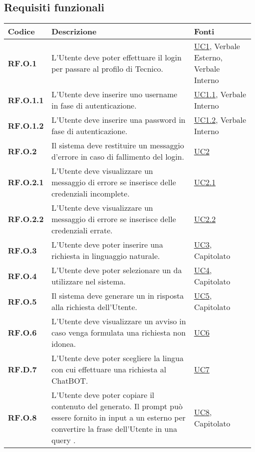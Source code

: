 \subsection{Requisiti funzionali}
\begin{longtable}{|P{3cm}|P{6,5cm}|>{\arraybackslash}P{4cm}|}
    \hline
    \textbf{Codice} & \textbf{Descrizione} & \textbf{Fonti} \\
    \hline
    \textbf{RF.O.1} & L'Utente deve poter effettuare il login per passare al profilo di Tecnico. & \hyperref[UC1]{UC1}, Verbale Esterno, Verbale Interno\\
    \hline
    \textbf{RF.O.1.1} & L'Utente deve inserire uno username in fase di autenticazione. & \hyperref[UC1point1]{UC1.1}, Verbale Interno\\
    \hline
    \textbf{RF.O.1.2} & L'Utente deve inserire una password in fase di autenticazione. & \hyperref[UC1point2]{UC1.2}, Verbale Interno\\
    \hline
    \textbf{RF.O.2} & Il sistema deve restituire un messaggio d'errore in caso di fallimento del login. & \hyperref[UC2]{UC2}\\
    \hline
    \textbf{RF.O.2.1} & L'Utente deve visualizzare un messaggio di errore se inserisce delle credenziali incomplete. & \hyperref[UC2point1]{UC2.1}\\
    \hline
    \textbf{RF.O.2.2} & L'Utente deve visualizzare un messaggio di errore se inserisce delle credenziali errate. & \hyperref[UC2point2]{UC2.2}\\
    \hline
    \textbf{RF.O.3} & L'Utente deve poter inserire una richiesta in linguaggio naturale. & \hyperref[UC3]{UC3}, Capitolato\\
    \hline
    \textbf{RF.O.4} & L'Utente deve poter selezionare un  da utilizzare nel sistema. & \hyperref[UC4]{UC4}, Capitolato\\
    \hline
    \textbf{RF.O.5} & Il sistema deve generare un  in risposta alla richiesta dell'Utente. & \hyperref[UC5]{UC5}, Capitolato\\
    \hline
    \textbf{RF.O.6} & L'Utente deve visualizzare un avviso in caso venga formulata una richiesta non idonea. & \hyperref[UC6]{UC6}\\
    \hline
    \textbf{RF.D.7} & L'Utente deve poter scegliere la lingua con cui effettuare una richiesta al ChatBOT. & \hyperref[UC7]{UC7}\\
    \hline
    \textbf{RF.O.8} & L'Utente deve poter copiare il contenuto del  generato. Il prompt può essere fornito in input a un  esterno per convertire la frase dell'Utente in una query . & \hyperref[UC8]{UC8}, Capitolato\\

\end{longtable}
